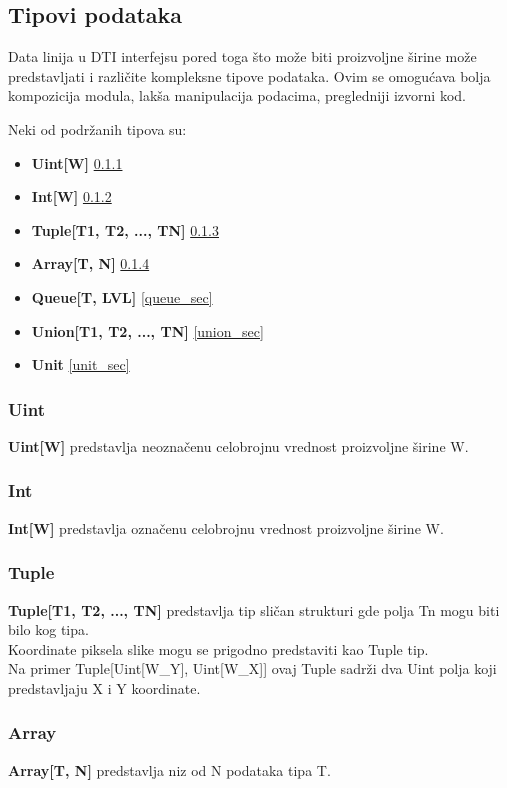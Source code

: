 \subsection{Tipovi podataka} \label{pygears_data_types}

Data linija u DTI interfejsu pored toga što može biti proizvoljne širine može
predstavljati i različite kompleksne tipove podataka.
Ovim se omogućava bolja kompozicija modula, lakša manipulacija podacima,
pregledniji izvorni kod.

Neki od podržanih tipova su:
\begin{itemize}
\item \textbf{Uint[W]} \ref{uint_sec}
\item \textbf{Int[W]} \ref{int_sec}
\item \textbf{Tuple[T1, T2, ..., TN]} \ref{tuple_sec}
\item \textbf{Array[T, N]} \ref{array_sec}
\item \textbf{Queue[T, LVL]} \ref{queue_sec}
\item \textbf{Union[T1, T2, ..., TN]} \ref{union_sec}
\item \textbf{Unit} \ref{unit_sec}
\end{itemize}

\subsubsection{Uint} \label{uint_sec}
\textbf{Uint[W]} predstavlja neoznačenu celobrojnu vrednost proizvoljne
širine W.

\subsubsection{Int} \label{int_sec}
\textbf{Int[W]} predstavlja označenu celobrojnu vrednost proizvoljne
  širine W.

\subsubsection{Tuple} \label{tuple_sec}
\textbf{Tuple[T1, T2, ..., TN]} predstavlja tip sličan strukturi gde
  polja Tn mogu biti bilo kog tipa. \\
  Koordinate piksela slike mogu se prigodno predstaviti kao Tuple tip. \\
  Na primer Tuple[Uint[W\_Y], Uint[W\_X]] ovaj Tuple sadrži dva Uint polja koji
  predstavljaju X i Y koordinate.

\subsubsection{Array} \label{array_sec}
\textbf{Array[T, N]} predstavlja niz od N podataka tipa T.

